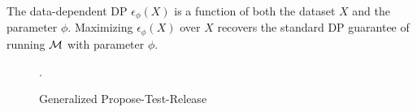 The data-dependent DP $\epsilon_\phi(X)$ is a function of both the dataset $X$ and the parameter $\phi$. Maximizing $\epsilon_\phi(X)$ over $X$ recovers the standard DP guarantee of running $\mathcal{M}$ with parameter $\phi$.



 
 
\begin{figure}[H]
\centering
\begin{algorithm}[H]
\caption{Generalized Propose-Test-Release}
\label{alg:gen_ptr}
\begin{algorithmic}[1]
.
\vspace{-1pt}
\end{algorithmic}
\end{algorithm}
\end{figure}

